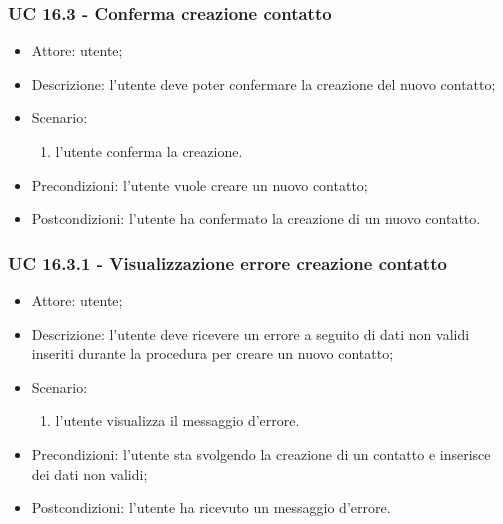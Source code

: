 \subsubsection{UC 16.3 - Conferma creazione contatto} \label{sec: UC 16.3}
\begin{itemize}
    \item Attore: utente;
    \item Descrizione: l'utente deve poter confermare la creazione del nuovo contatto;
    \item Scenario:
        \begin{enumerate}
        \item l'utente conferma la creazione.
        \end{enumerate}
    
    \item Precondizioni: l'utente vuole creare un nuovo contatto;
    \item Postcondizioni: l'utente ha confermato la creazione di un nuovo contatto.
\end{itemize}


\subsubsection{UC 16.3.1 - Visualizzazione errore creazione contatto} \label{sec: UC 16.3.1}
\begin{itemize}
    \item Attore: utente;
    \item Descrizione: l'utente deve ricevere un errore a seguito di dati non validi inseriti durante la procedura per creare un nuovo contatto;
    \item Scenario:
        \begin{enumerate}
        \item l'utente visualizza il messaggio d'errore.
        \end{enumerate}
    
    \item Precondizioni: l'utente sta svolgendo la creazione di un contatto e inserisce dei dati non validi;
    \item Postcondizioni: l'utente ha ricevuto un messaggio d'errore.
\end{itemize}


